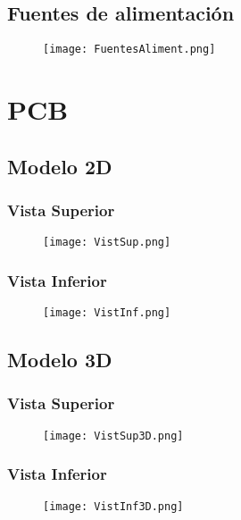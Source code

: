 \subsection{Fuentes de alimentación}
\begin{figure}[H]
	\centering
	\texttt{[image: FuentesAliment.png]}
	\label{fig:FuentesAliment}
\end{figure}

\section{PCB}
\subsection{Modelo 2D}
\subsubsection{Vista Superior}
\begin{figure}[H]
	\centering
	\texttt{[image: VistSup.png]}
	\label{fig:VistSup}
\end{figure}

\subsubsection{Vista Inferior}
\begin{figure}[H]
	\centering
	\texttt{[image: VistInf.png]}
	\label{fig:VistInf}
\end{figure}

\subsection{Modelo 3D}
\subsubsection{Vista Superior}
\begin{figure}[H]
	\centering
	\texttt{[image: VistSup3D.png]}
	\label{fig:VistSup3D}
\end{figure}

\subsubsection{Vista Inferior}
\begin{figure}[H]
	\centering
	\texttt{[image: VistInf3D.png]}
	\label{fig:VistInf3D}
\end{figure}

